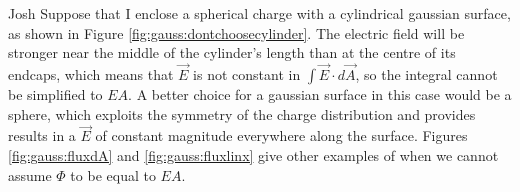 \begin{studentOpinion}{Josh}
Suppose that I enclose a spherical charge with a cylindrical gaussian surface, as shown in Figure \ref{fig:gauss:dontchoosecylinder}. The electric field will be stronger near the middle of the cylinder's length than at the centre of its endcaps, which means that $\vec E$ is not constant in $\int \vec E \cdot d \vec A$, so the integral cannot be simplified to $EA$. A better choice for a gaussian surface in this case would be a sphere, which exploits the symmetry of the charge distribution and provides results in a $\vec E$ of constant magnitude everywhere along the surface. Figures \ref{fig:gauss:fluxdA} and \ref{fig:gauss:fluxlinx} give other examples of when we cannot assume $\Phi$ to be equal to $EA$.
	
\end{studentOpinion}

